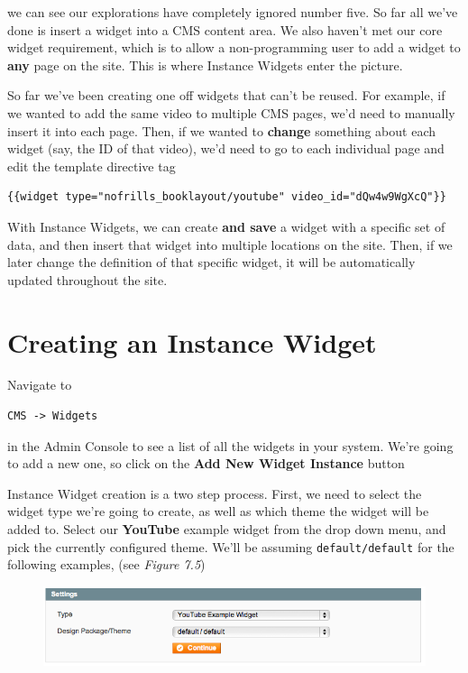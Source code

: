 \documentclass[oneside]{book}
\begin{document}
we can see our explorations have completely ignored number five.  So far all we've done is insert a widget into a CMS content area.  We also haven't met our core widget requirement, which is to allow a non-programming user to add a widget to \textbf{any} page on the site. This is where Instance Widgets enter the picture.

So far we've been creating one off widgets that can't be reused.  For example, if we wanted to add the same video to multiple CMS pages, we'd need to manually insert it into each page.  Then, if we wanted to \textbf{change} something about each widget (say, the ID of that video), we'd need to go to each individual page and edit the template directive tag

\begin{lstlisting}
{{widget type="nofrills_booklayout/youtube" video_id="dQw4w9WgXcQ"}}

\end{lstlisting}


With Instance Widgets, we can create \textbf{and save} a widget with a specific set of data, and then insert that widget into multiple locations on the site.  Then, if we later change the definition of that specific widget, it will be automatically updated throughout the site.  

\section{Creating an Instance Widget}

Navigate to

\begin{lstlisting}
CMS -> Widgets

\end{lstlisting}


in the Admin Console to see a list of all the widgets in your system.  We're going to add a new one, so click on the \textbf{Add New Widget Instance} button

Instance Widget creation is a two step process.  First, we need to select the widget type we're going to create, as well as which theme the widget will be added to.  Select our \textbf{YouTube} example widget from the drop down menu, and pick the currently configured theme.  We'll be assuming \footnotesize\texttt{default/default} \normalsize  for the following examples, (see \emph{Figure 7.5}) 

\begin{figure}[htb]
\begin{center}
\leavevmode
\includegraphics[width=1\textwidth]{images/chapter7/instance-step1.png}
\end{center}
\caption{}
\end{figure}
\end{document}
